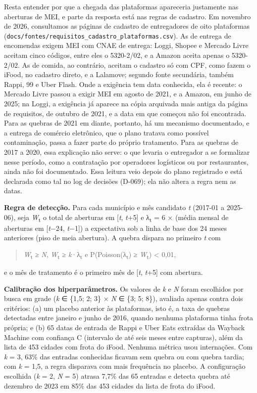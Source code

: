 \documentclass[
  11pt,
]{article}
\begin{document}
Resta entender por que a chegada das plataformas apareceria justamente nas aberturas de MEI, e parte da resposta está nas regras de cadastro. Em novembro de 2026, consultamos as páginas de cadastro de entregadores de oito plataformas (\texttt{docs/fontes/requisitos\_cadastro\_plataformas.csv}). As de entrega de encomendas exigem MEI com CNAE de entrega: Loggi, Shopee e Mercado Livre aceitam cinco códigos, entre eles o 5320-2/02, e a Amazon aceita apenas o 5320-2/02. As de comida, ao contrário, aceitam o cadastro só com CPF, como fazem o iFood, no cadastro direto, e a Lalamove; segundo fonte secundária, também Rappi, 99 e Uber Flash. Onde a exigência tem data conhecida, ela é recente: o Mercado Livre passou a exigir MEI em agosto de 2021, e a Amazon, em junho de 2025; na Loggi, a exigência já aparece na cópia arquivada mais antiga da página de requisitos, de outubro de 2021, e a data em que começou não foi encontrada. Para as quebras de 2021 em diante, portanto, há um mecanismo documentado, e a entrega de comércio eletrônico, que o plano tratava como possível contaminação, passa a fazer parte do próprio tratamento. Para as quebras de 2017 a 2020, essa explicação não serve: o que levaria o entregador a se formalizar nesse período, como a contratação por operadores logísticos ou por restaurantes, ainda não foi documentado. Essa leitura veio depois do plano registrado e está declarada como tal no log de decisões (D-069); ela não altera a regra nem as datas.

\textbf{Regra de detecção.} Para cada município e mês candidato \emph{t} (2017-01 a 2025-06), seja \emph{W}\textsubscript{t} o total de aberturas em {[}\emph{t}, \emph{t}+5{]} e λ\textsubscript{t} = 6 × (média mensal de aberturas em {[}\emph{t}−24, \emph{t}−1{]}) a expectativa sob a linha de base dos 24 meses anteriores (piso de meia abertura). A quebra dispara no primeiro \emph{t} com

\begin{quote}
\emph{W}\textsubscript{t} ≥ \emph{N}, \emph{W}\textsubscript{t} ≥ \emph{k}·λ\textsubscript{t} e P(Poisson(λ\textsubscript{t}) ≥ \emph{W}\textsubscript{t}) \textless{} 0,01,
\end{quote}

e o mês de tratamento é o primeiro mês de {[}\emph{t}, \emph{t}+5{]} com abertura.

\textbf{Calibração dos hiperparâmetros.} Os valores de \emph{k} e \emph{N} foram escolhidos por busca em grade (\emph{k} ∈ \{1,5; 2; 3\} × \emph{N} ∈ \{3; 5; 8\}), avaliada apenas contra dois critérios: (a) um placebo anterior às plataformas, isto é, a taxa de quebras detectadas entre janeiro e junho de 2016, quando nenhuma plataforma tinha frota própria; e (b) 65 datas de entrada de Rappi e Uber Eats extraídas da Wayback Machine com confiança C (intervalo de até seis meses entre capturas), além da lista de 453 cidades com frota do iFood. Nenhuma métrica usou internações. Com \emph{k} = 3, 63\% das entradas conhecidas ficavam sem quebra ou com quebra tardia; com \emph{k} = 1,5, a regra disparava com mais frequência no placebo. A configuração escolhida (\emph{k} = 2, \emph{N} = 5) atrasa 7,7\% das 65 entradas e detecta quebra até dezembro de 2023 em 85\% das 453 cidades da lista de frota do iFood.
\end{document}
